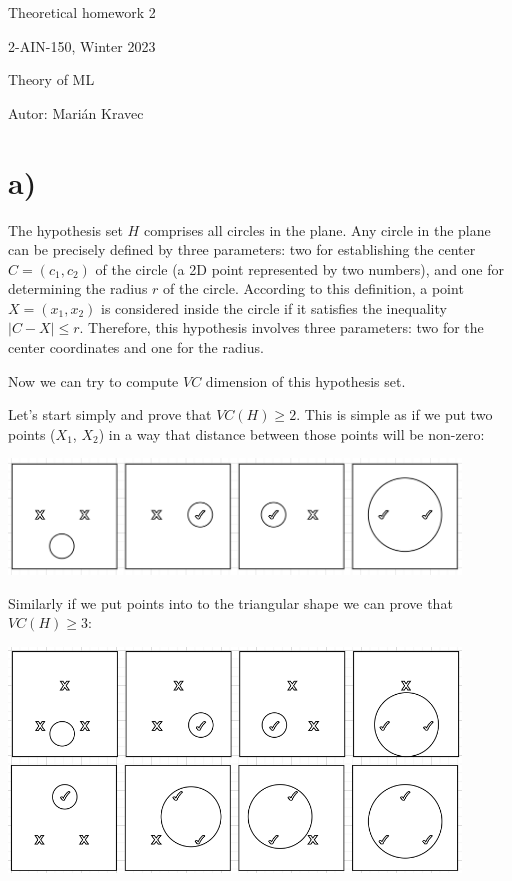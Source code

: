 \documentclass[a4paper]{article}
\begin{document}
 
	
	\pagestyle{plain}

	\begin{center}
		\sc\large
		Theoretical homework 2
		
		2-AIN-150, Winter 2023
		
		Theory of ML
	\end{center}
	
	Autor: Marián Kravec
	
	\section{a)}
	
	The hypothesis set $H$ comprises all circles in the plane. Any circle in the plane can be precisely defined by three parameters: two for establishing the center $C=(c_1,c_2)$ of the circle (a 2D point represented by two numbers), and one for determining the radius $r$ of the circle. According to this definition, a point $X=(x_1,x_2)$ is considered inside the circle if it satisfies the inequality $|C-X|\leq r$. Therefore, this hypothesis involves three parameters: two for the center coordinates and one for the radius.
	
	Now we can try to compute $VC$ dimension of this hypothesis set.
	
	Let's start simply and prove that $VC(H) \geq 2$.
	This is simple as if we put two points ($X_1$, $X_2$) in a way that distance between those points will be non-zero:
	
	\centerline{\includegraphics[width=0.9\textwidth]{circles_2}} 
	
	Similarly if we put points into to the triangular shape we can prove that $VC(H) \geq 3$:
	
	\centerline{\includegraphics[width=0.9\textwidth]{circles_3}} 
	
\end{document}
